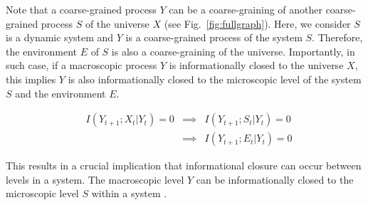 \documentclass[utf8]{article}
\begin{document}
        Note that a coarse-grained process $Y$ can be a coarse-graining of another coarse-grained process $S$ of the universe $X$ (see Fig.~\ref{fig:fullgraph}). Here, we consider $S$ is a dynamic system and $Y$ is a coarse-grained process of the system $S$. Therefore, the environment $E$ of $S$ is also a coarse-graining of the universe. Importantly, in such case, if a macroscopic process $Y$ is informationally closed to the universe $X$, this implies $Y$ is also informationally closed to the microscopic level of the system $S$ and the environment $E$. 
        
		\begin{equation}
			\label{eq:ICchain}
			\begin{aligned}
		    & I(Y_{t+1};X_t|Y_{t})=0 & \implies & I(Y_{t+1};S_t|Y_{t})=0 \\
		    & {} & \implies & I(Y_{t+1};E_t|Y_{t})=0
			\end{aligned}
		\end{equation}
		
        
        This results in a crucial implication that informational closure can occur between levels in a system. The macroscopic level $Y$ can be informationally closed to the microscopic level $S$ within a system \citep{PFANTE.2014}.
\end{document}
